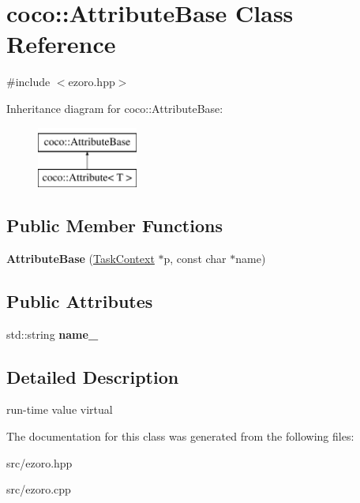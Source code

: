 \hypertarget{classcoco_1_1_attribute_base}{\section{coco\-:\-:Attribute\-Base Class Reference}
\label{classcoco_1_1_attribute_base}
}


{\ttfamily \#include $<$ezoro.\-hpp$>$}

Inheritance diagram for coco\-:\-:Attribute\-Base\-:\begin{figure}[H]
\begin{center}
\leavevmode
\includegraphics[height=2.000000cm]{classcoco_1_1_attribute_base}
\end{center}
\end{figure}
\subsection*{Public Member Functions}
\begin{DoxyCompactItemize}
\item 
\hypertarget{classcoco_1_1_attribute_base_a5d0a648bbf6790e716897bb11a20efe9}{{\bfseries Attribute\-Base} (\hyperlink{classcoco_1_1_task_context}{Task\-Context} $\ast$p, const char $\ast$name)}\label{classcoco_1_1_attribute_base_a5d0a648bbf6790e716897bb11a20efe9}

\end{DoxyCompactItemize}
\subsection*{Public Attributes}
\begin{DoxyCompactItemize}
\item 
\hypertarget{classcoco_1_1_attribute_base_afcfc37b436c721506d1c70fa62cfdfc7}{std\-::string {\bfseries name\-\_\-}}\label{classcoco_1_1_attribute_base_afcfc37b436c721506d1c70fa62cfdfc7}

\end{DoxyCompactItemize}


\subsection{Detailed Description}
run-\/time value  virtual 

The documentation for this class was generated from the following files\-:\begin{DoxyCompactItemize}
\item 
src/ezoro.\-hpp\item 
src/ezoro.\-cpp\end{DoxyCompactItemize}

